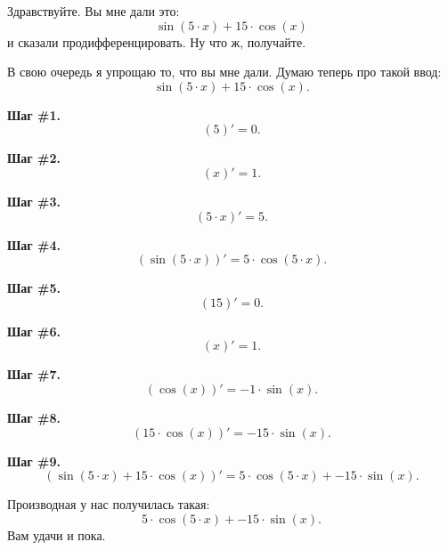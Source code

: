 \documentclass{article}
\begin{document}
Здравствуйте. Вы мне дали это: $$\sin\left(5 \cdot x\right) + 15 \cdot \cos\left(x\right)$$ и сказали продифференцировать. Ну что ж, получайте.

В свою очередь я упрощаю то, что вы мне дали. Думаю теперь про такой ввод: $$\sin\left(5 \cdot x\right) + 15 \cdot \cos\left(x\right).$$

\textbf{Шаг \#1.} $${\left( 5 \right) }' = 0.$$

\textbf{Шаг \#2.} $${\left( x \right) }' = 1.$$

\textbf{Шаг \#3.} $${\left( 5 \cdot x \right) }' = 5.$$

\textbf{Шаг \#4.} $${\left( \sin\left(5 \cdot x\right) \right) }' = 5 \cdot \cos\left(5 \cdot x\right).$$

\textbf{Шаг \#5.} $${\left( 15 \right) }' = 0.$$

\textbf{Шаг \#6.} $${\left( x \right) }' = 1.$$

\textbf{Шаг \#7.} $${\left( \cos\left(x\right) \right) }' = -1 \cdot \sin\left(x\right).$$

\textbf{Шаг \#8.} $${\left( 15 \cdot \cos\left(x\right) \right) }' = -15 \cdot \sin\left(x\right).$$

\textbf{Шаг \#9.} $${\left( \sin\left(5 \cdot x\right) + 15 \cdot \cos\left(x\right) \right) }' = 5 \cdot \cos\left(5 \cdot x\right) + -15 \cdot \sin\left(x\right).$$

Производная у нас получилась такая: $$
5 \cdot \cos\left(5 \cdot x\right) + -15 \cdot \sin\left(x\right).$$ Вам удачи и пока.
\end{document}

